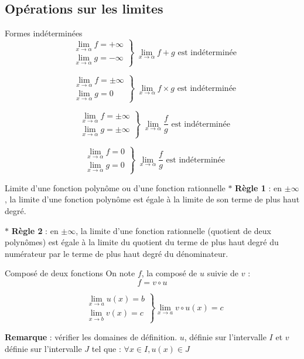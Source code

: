 \subsection{Opérations sur les limites}
\begin{bclogo}{Formes indéterminées}
\[\;\left.\begin{array}{c}  \lim\limits_{x \to \alpha} f=+\infty \\ \lim\limits_{x\to \alpha } g =-\infty \end{array}\right\}\;\lim\limits_{x\to \alpha} f+g \text{ est indéterminée}\] 

\[\;\left.\begin{array}{c}  \lim\limits_{x \to \alpha} f=\pm \infty \\ \lim\limits_{x\to \alpha } g =0 \end{array}\right\}\;\lim\limits_{x\to \alpha} f\times g \text{ est indéterminée}\] 

\[\;\left.\begin{array}{c}  \lim\limits_{x \to \alpha} f=\pm \infty \\ \lim\limits_{x\to \alpha } g =\pm \infty \end{array}\right\}\;\lim\limits_{x\to \alpha} \frac{f}{g} \text{ est indéterminée}\] 

\[\;\left.\begin{array}{c}  \lim\limits_{x \to \alpha} f=0 \\ \lim\limits_{x\to \alpha } g =0 \end{array}\right\}\;\lim\limits_{x\to \alpha} \frac{f}{g} \text{ est indéterminée}\] 
\end{bclogo}


\medskip 

\begin{bclogo}{Limite d'une fonction polynôme ou d'une fonction rationnelle}
$\ast$ \textbf{Règle 1} : en $\pm \infty$, la limite d'une fonction polynôme est égale à la limite de son terme de plus haut degré.

$\ast$ \textbf{Règle 2} : en $\pm \infty$, la limite d'une fonction rationnelle (quotient de deux polynômes) est égale à la limite du quotient du terme de plus haut degré du numérateur par le terme de plus haut degré du dénominateur.

\end{bclogo}

\medskip
\begin{bclogo}{Composé de deux fonctions}
On note $f$, la composé de $u$ suivie de $v$ : \[f=v\circ u\]

\[\;\left.\begin{array}{c}  \lim\limits_{x \to a} u(x)=b \\ \lim\limits_{x\to b } v(x) =c \end{array}\right\}\lim\limits_{x\to a} v\circ u(x) =c\] 

\textbf{Remarque }: vérifier les domaines de définition. $u$, définie sur l'intervalle $I$ et $v$ définie sur l'intervalle $J$ tel que : $\forall x \in I, u(x) \in J$
\end{bclogo}

